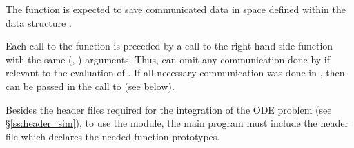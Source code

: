 {
  The  function is expected to save communicated data in space defined
  within the data structure . 

  Each call to the  function is preceded by a call to the right-hand side
  function  with the same (, ) arguments.  Thus,  can omit 
  any communication done by  if relevant to the evaluation of .  
  If all necessary communication was done in , then 
  can be passed in the call to  (see below).
}

Besides the header files required for the integration of the ODE problem
(see \S\ref{ss:header_sim}),  to use the {\cvbbdpre} module, the main program 
must include the header file  which declares the needed
function prototypes.

